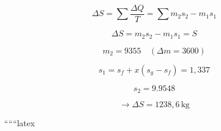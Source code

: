 \begin{equation*}
\Delta S = \sum \frac{\Delta Q}{T} = \sum m_2 s_2 - m_1 s_1
\end{equation*}

\begin{equation*}
\Delta S = m_2 s_2 - m_1 s_1 = S
\end{equation*}

\begin{equation*}
m_2 = 9355 \quad (\Delta m = 3600)
\end{equation*}

\begin{equation*}
s_1 = s_f + x (s_g - s_f) = 1,337
\end{equation*}

\begin{equation*}
s_2 = 9.9548
\end{equation*}

\begin{equation*}
\rightarrow \Delta S = 1238,6 \, \text{kg}
\end{equation*}

``````latex


